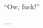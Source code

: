 \thispagestyle{empty}

\vspace*{\fill}

\epigraph{
  ``Ow, fuck!''
}{---\textcite[561]{sturrock-2010}}

\vspace*{\fill}
